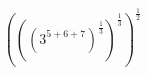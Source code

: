 \documentclass[preview]{standalone}
\begin{document}
\begin{align*}
\left(\left(\left(3^{5+6+7} \right)^\frac{1}{3} \right)^\frac{1}{3} \right)^\frac{1}{2}
\end{align*}
\end{document}
